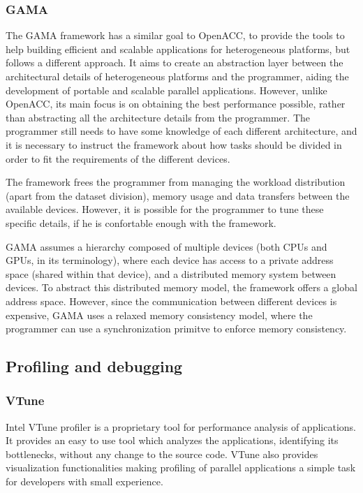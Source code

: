 \subsubsection*{GAMA}
\label{GAMA}

The GAMA framework \cite{GAMA} has a similar goal to OpenACC, to provide the tools to help building efficient and scalable applications for heterogeneous platforms, but follows a different approach. It aims to create an abstraction layer between the architectural details of heterogeneous platforms and the programmer, aiding the development of portable and scalable parallel applications. However, unlike OpenACC, its main focus is on obtaining the best performance possible, rather than abstracting all the architecture details from the programmer. The programmer still needs to have some knowledge of each different architecture, and it is necessary to instruct the framework about how tasks should be divided in order to fit the requirements of the different devices.

The framework frees the programmer from managing the workload distribution (apart from the dataset division), memory usage and data transfers between the available devices. However, it is possible for the programmer to tune these specific details, if he is confortable enough with the framework.

GAMA assumes a hierarchy composed of multiple devices (both CPUs and GPUs, in its terminology), where each device has access to a private address space (shared within that device), and a distributed memory system between devices. To abstract this distributed memory model, the framework offers a global address space. However, since the communication between different devices is expensive, GAMA uses a relaxed memory consistency model, where the programmer can use a synchronization primitve to enforce memory consistency.

\subsection{Profiling and debugging}
\label{ProfilingDebugging}

\subsubsection*{VTune}
\label{VTune}

Intel VTune profiler \cite{Intel:VTune} is a proprietary tool for performance analysis of applications. It provides an easy to use tool which analyzes the applications, identifying its bottlenecks, without any change to the source code. VTune also provides visualization functionalities making profiling of parallel applications a simple task for developers with small experience.

